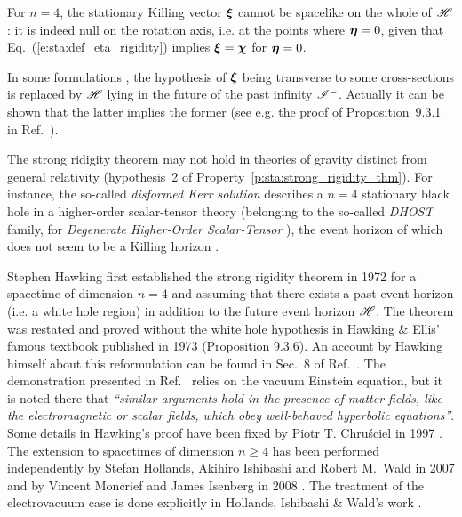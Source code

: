 \begin{remark}
For $n=4$, the stationary Killing vector $\bm{\xi}$ cannot be spacelike
on the whole of $\mathscr{H}$: it is indeed null on the rotation axis, i.e.
at the points where $\bm{\eta} = 0$, given that Eq.~(\ref{e:sta:def_eta_rigidity})
implies $\bm{\xi} = \bm{\chi}$ for $\bm{\eta}=0$.
\end{remark}

\begin{remark}
In some formulations \cite{HollaIW07,HawkiE73}, the hypothesis of $\bm{\xi}$
being transverse to some cross-sections is replaced by $\mathscr{H}$ lying in
the future of the past infinity $\mathscr{I}^-$. Actually it can be shown
that the latter implies the former (see e.g. the proof of Proposition~9.3.1
in Ref.~\cite{HawkiE73}).
\end{remark}

\begin{remark} \label{r:sta:non_Killing}
The strong ridigity theorem may not hold in theories of gravity distinct
from general relativity (hypothesis~2 of Property~\ref{p:sta:strong_rigidity_thm}).
For instance, the so-called \emph{disformed Kerr solution}
\cite{AnsonBCH21,BenAc_al20}
describes a $n=4$ stationary black hole in a higher-order scalar-tensor theory (belonging to the
so-called \emph{DHOST} family, for \emph{Degenerate Higher-Order Scalar-Tensor} \cite{Langl19,BenAc25}), the event horizon of which does not seem to be a Killing horizon
\cite{AnsonBCH21}.
\end{remark}


\begin{hist}
Stephen Hawking first established the strong rigidity
theorem in 1972 \cite{Hawki72}
for a spacetime of dimension $n=4$ and assuming that there exists
a past event horizon (i.e. a white hole region) in addition to the
future event horizon $\mathscr{H}$.
The theorem was restated and proved without the white hole hypothesis
in Hawking \& Ellis' famous textbook published in 1973 \cite{HawkiE73}
(Proposition 9.3.6).
An account by Hawking himself
about this reformulation can be found in
Sec.~8 of Ref.~\cite{Hawki73}. The demonstration presented in Ref.~\cite{HawkiE73}
relies on the vacuum Einstein equation,
but it is noted there that \emph{``similar arguments hold in the presence
of matter fields, like the electromagnetic or scalar fields, which obey
well-behaved hyperbolic equations''}.
Some details in Hawking's proof have been fixed
by Piotr T. Chru\'sciel in 1997 \cite{Chrus97}.
The extension to spacetimes of
dimension $n\geq 4$ has been performed independently by
Stefan Hollands, Akihiro Ishibashi
and Robert M.~Wald in 2007 \cite{HollaIW07}
and by Vincent Moncrief and James Isenberg
in 2008 \cite{MoncrI08}. The treatment of the electrovacuum
case is done explicitly in Hollands, Ishibashi \& Wald's work \cite{HollaIW07}.
\end{hist}

